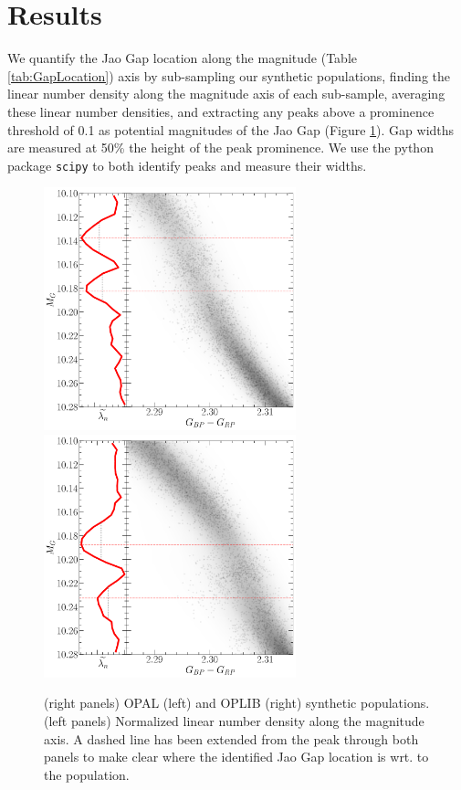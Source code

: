 \section{Results}\label{sec:results}
We quantify the Jao Gap location along the magnitude (Table
\ref{tab:GapLocation}) axis by sub-sampling our synthetic populations, finding
the linear number density along the magnitude axis of each sub-sample,
averaging these linear number densities, and extracting any peaks above a
prominence threshold of 0.1 as potential magnitudes of the Jao Gap (Figure
\ref{fig:JaoGapLocator}). Gap widths are measured at 50\% the height of the peak
prominence. We use the python package \texttt{scipy} \citep{2020SciPy-NMeth} to
both identify peaks and measure their widths. 

\begin{figure}[ht!]
	\centering
	\includegraphics[width=0.65\textwidth]{figures/jaoOpacity/OPAL_Jao_locator.pdf}
	\includegraphics[width=0.65\textwidth]{figures/jaoOpacity/OPLIB_Jao_locator.pdf}
	\caption{(right panels) OPAL (left) and OPLIB (right) synthetic
	populations. (left panels) Normalized linear number density along the
	magnitude axis. A dashed line has been extended from the peak through both
	panels to make clear where the identified Jao Gap location is wrt. to the
	population. }
	\label{fig:JaoGapLocator}
\end{figure}

